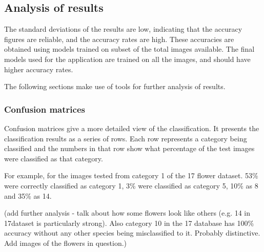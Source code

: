 \documentclass[11pt, a4paper]{report}
\begin{document}
\subsection{Analysis of results}
%
%
%

The standard deviations of the results are low, indicating that the accuracy figures are reliable, and the accuracy rates are high. These accuracies are obtained using models trained on subset of the total images available. The final models used for the application are trained on all the images, and should have higher accuracy rates.

The following sections make use of tools for further analysis of results. 

\subsubsection{Confusion matrices}

Confusion matrices give a more detailed view of the classification. It presents the classification results as a series of rows. Each row represents a category being classified and the numbers in that row show what percentage of the test images were classified as that category. 

For example, for the images tested from category 1 of the 17 flower dataset. 53\% were correctly classified as category 1, 3\% were classified as category 5, 10\% as 8 and 35\% as 14.

(add further analysis - talk about how some flowers look like others (e.g. 14 in 17dataset is particularly strong). Also category 10 in the 17 database has 100\% accuracy without any other species being misclassified to it. Probably distinctive. Add images of the flowers in question.)
\end{document}
